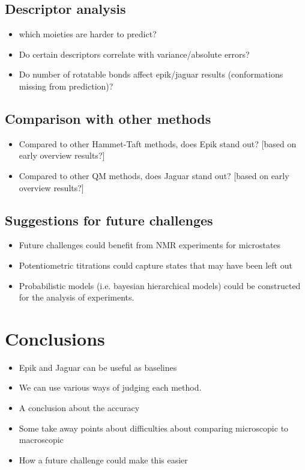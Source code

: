 \documentclass[9pt,lineno,final]{elife}
\begin{document}
\subsection{Descriptor analysis}
\begin{itemize}
	\item which moieties are harder to predict?
	\item Do certain descriptors correlate with variance/absolute errors?
	\item Do number of rotatable bonds affect epik/jaguar results (conformations missing from prediction)?
\end{itemize}

\subsection {Comparison with other methods}
\begin{itemize}
	\item Compared to other Hammet-Taft methods, does Epik stand out? [based on early overview results?]
	\item Compared to other QM methods, does Jaguar stand out? [based on early overview results?]
\end{itemize}

\subsection{Suggestions for future challenges}
\begin{itemize}
	\item Future challenges could benefit from NMR experiments for microstates
	\item Potentiometric titrations could capture states that may have been left out
	\item Probabilistic models (i.e. bayesian hierarchical models) could be constructed for the analysis of experiments. 
\end{itemize}

\section{Conclusions}

\begin{itemize}
	\item Epik and Jaguar can be useful as baselines
	\item We can use various ways of judging each method.
	\item A conclusion about the accuracy
	\item Some take away points about difficulties about comparing microscopic to macroscopic
	\item How a future challenge could make this easier
\end{itemize}
\end{document}
